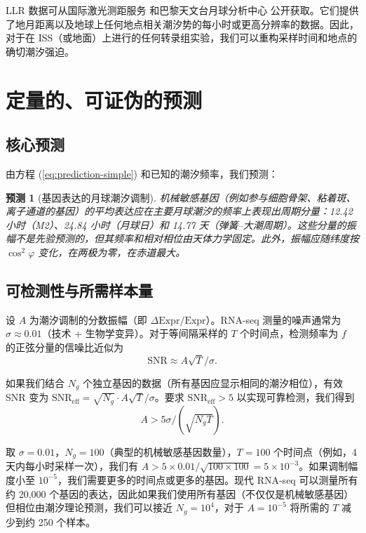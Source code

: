 \documentclass[12pt,a4paper]{article}
\newtheorem{prediction}[theorem]{预测}
\theoremstyle{remark}
\begin{document}
	LLR 数据可从国际激光测距服务 \cite{ILRS} 和巴黎天文台月球分析中心 \cite{LLR-POLAC} 公开获取。它们提供了地月距离以及地球上任何地点相关潮汐势的每小时或更高分辨率的数据。因此，对于在 ISS（或地面）上进行的任何转录组实验，我们可以重构采样时间和地点的确切潮汐强迫。
	
	\section{定量的、可证伪的预测}
	\label{sec:prediction}
	
	\subsection{核心预测}
	
	由方程 (\ref{eq:prediction-simple}) 和已知的潮汐频率，我们预测：
	
	\begin{prediction}[基因表达的月球潮汐调制]
		机械敏感基因（例如参与细胞骨架、粘着斑、离子通道的基因）的平均表达应在主要月球潮汐的频率上表现出周期分量：12.42 小时（M2）、24.84 小时（月球日）和 14.77 天（弹簧–大潮周期）。这些分量的振幅不是先验预测的，但其频率和相对相位由天体力学固定。此外，振幅应随纬度按 \(\cos^2\varphi\) 变化，在两极为零，在赤道最大。
	\end{prediction}
	
	\subsection{可检测性与所需样本量}
	
	设 \(A\) 为潮汐调制的分数振幅（即 \(\Delta\text{Expr}/\text{Expr}\)）。RNA-seq 测量的噪声通常为 \(\sigma \approx 0.01\)（技术 + 生物学变异）。对于等间隔采样的 \(T\) 个时间点，检测频率为 \(f\) 的正弦分量的信噪比近似为
	\[
	\mathrm{SNR} \approx A \sqrt{T} / \sigma .
	\]
	
	如果我们结合 \(N_g\) 个独立基因的数据（所有基因应显示相同的潮汐相位），有效 SNR 变为 \(\mathrm{SNR}_{\text{eff}} = \sqrt{N_g} \cdot A \sqrt{T} / \sigma\)。要求 \(\mathrm{SNR}_{\text{eff}} > 5\) 以实现可靠检测，我们得到
	\[
	A > 5 \sigma / (\sqrt{N_g T}).
	\]
	
	取 \(\sigma = 0.01\)，\(N_g = 100\)（典型的机械敏感基因数量），\(T = 100\) 个时间点（例如，4 天内每小时采样一次），我们有 \(A > 5\times 0.01 / \sqrt{100\times 100} = 5\times 10^{-3}\)。如果调制幅度小至 \(10^{-5}\)，我们需要更多的时间点或更多的基因。现代 RNA-seq 可以测量所有约 20,000 个基因的表达，因此如果我们使用所有基因（不仅仅是机械敏感基因）但相位由潮汐理论预测，我们可以接近 \(N_g = 10^4\)，对于 \(A = 10^{-5}\) 将所需的 \(T\) 减少到约 250 个样本。
	
\end{document}
